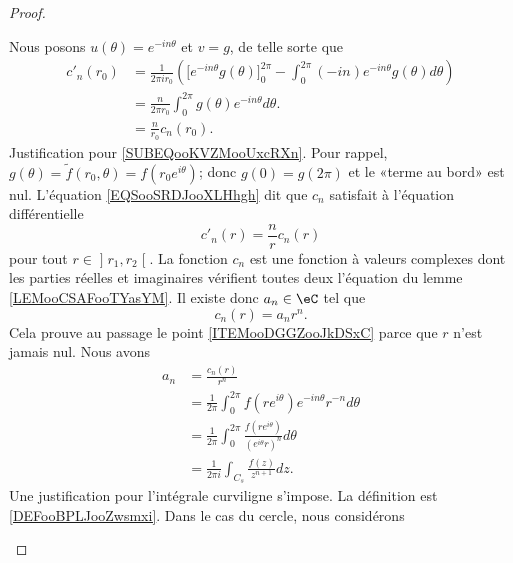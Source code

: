 \begin{proof}
\begin{subproof}
			Nous posons \( u(\theta)= e^{-in\theta}\) et \( v=g\), de telle sorte que
			\begin{subequations}        \label{EQSooSRDJooXLHhgh}
				\begin{align}
					c'_n(r_0) & =\frac{1}{ 2\pi i r_0 }\left( \big[ e^{-in\theta}g(\theta)\big]_0^{2\pi}-\int_0^{2\pi}(-in) e^{-in\theta}g(\theta)d\theta \right) \\
					          & =\frac{n}{ 2\pi r_0 }\int_0^{2\pi}g(\theta) e^{-in\theta}d\theta.           \label{SUBEQooKVZMooUxcRXn}                           \\
					          & =\frac{n}{ r_0 }c_n(r_0).
				\end{align}
			\end{subequations}
			Justification pour \eqref{SUBEQooKVZMooUxcRXn}. Pour rappel, \( g(\theta)=\tilde f(r_0,\theta)=f(r_0 e^{i\theta})\); donc \( g(0)=g(2\pi)\) et le «terme au bord» est nul.
			L'équation \eqref{EQSooSRDJooXLHhgh} dit que \( c_n\) satisfait à l'équation différentielle
			\begin{equation}
				c'_n(r)=\frac{ n }{ r }c_n(r)
			\end{equation}
			pour tout \( r\in \mathopen] r_1 , r_2 \mathclose[\). La fonction \( c_n\) est une fonction à valeurs complexes dont les parties réelles et imaginaires vérifient toutes deux l'équation du lemme \ref{LEMooCSAFooTYasYM}. Il existe donc \( a_n\in \eC\) tel que
			\begin{equation}
				c_n(r)=a_nr^n.
			\end{equation}
			Cela prouve au passage le point \ref{ITEMooDGGZooJkDSxC} parce que \( r\) n'est jamais nul.
			\spitem[La valeur de \( a_n\)]
			Nous avons
			\begin{equation}        \label{EQooFNUHooZbbNAT}
				\begin{aligned}
					a_n & =\frac{ c_n(r) }{ r^n }                                                               \\
					    & =\frac{1}{ 2\pi }\int_0^{2\pi}f(r e^{i\theta}) e^{-in\theta}r^{-n}d\theta             \\
					    & =\frac{1}{ 2\pi }  \int_0^{2\pi}\frac{ f(r e^{i\theta}) }{ ( e^{i\theta}r)^n }d\theta \\
					    & =\frac{1}{ 2\pi i }\int_{C_s}\frac{ f(z) }{ z^{n+1} }dz.
				\end{aligned}
			\end{equation}
			Une justification pour l'intégrale curviligne s'impose. La définition est \ref{DEFooBPLJooZwsmxi}. Dans le cas du cercle, nous considérons

\end{subproof}
\end{proof}
